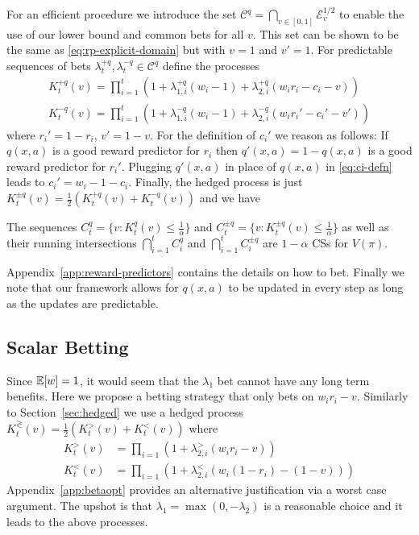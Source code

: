 For an efficient procedure we introduce the set 
$\mathcal{C}^q=\bigcap_{v \in [0,1]}\mathcal{E}_v^{1/2}$
to enable the use of our lower bound and common bets for all $v$.
This set can be shown to be the same as \eqref{eq:rp-explicit-domain}
but with $v=1$ and $v'=1$. For predictable sequences of 
bets $\lambda_{t}^{+q},\lambda_{t}^{-q}\in \mathcal{C}^q$ 
define the processes
\begin{align*}
K_t^{+q}(v) = \prod_{i=1}^{t}\left(1+\lambda_{1,i}^{+q} (w_i-1)+\lambda_{2,i}^{+q}(w_i r_i-c_i-v)\right)    \\
K_t^{-q}(v) = \prod_{i=1}^{t}\left(1+\lambda_{1,i}^{-q} (w_i-1)+\lambda_{2,i}^{-q} (w_i r_i'-c_i'-v')\right)    
\end{align*}
where $r_i'=1-r_i$, $v'=1-v$. For the definition of
$c_i'$ we reason as follows: If $q(x,a)$ is a good reward predictor
for $r_i$ then $q'(x,a)=1-q(x,a)$ is a good reward predictor for $r_i'$. 
Plugging $q'(x,a)$ in place of $q(x,a)$ in \eqref{eq:ci-defn} leads 
to $c_i' = w_i - 1 - c_i$. Finally, the hedged process is just
$
K_t^{\pm q}(v)=\frac{1}{2} (K_t^{+q}(v)+K_t^{-q}(v))
$
and we have
\begin{theorem}
The sequences $C_t^{q} = \{v:K_t^{q}(v)\leq \frac{1}{\alpha}\}$ and 
$C_t^{\pm q} = \{v:K_t^{\pm q}(v)\leq \frac{1}{\alpha}\}$ as well as
their running intersections $\bigcap_{i=1}^t C_i^{q}$ and
$\bigcap_{i=1}^t C_i^{\pm q}$ are $1-\alpha$ CSs for $V(\pi)$.
\end{theorem}
Appendix~\ref{app:reward-predictors} contains the details on how to bet.
Finally we note that our framework allows for $q(x,a)$ to be updated in every step as long as the updates are predictable. 

\subsection{Scalar Betting}
\label{sec:scalar}
Since $\mathbb{E}[w]=1$, it would seem that the $\lambda_1$ bet cannot have any long
term benefits. Here we propose a betting strategy that only
bets on $w_i r_i -v$.  Similarly to Section~\ref{sec:hedged} we use a hedged
process $K_t^{\gtrless}(v)=\frac{1}{2}\left(K_t^{>}(v)+K_t^{<}(v)\right)$ where
\begin{align*}
K_t^{>}(v)&=\prod_{i=1} \left(1+\lambda_{2,i}^{>} (w_i r_i -v)\right)\\
K_t^{<}(v)&=\prod_{i=1} \left(1+\lambda_{2,i}^{<} \left(w_i (1-r_i) -(1-v)\right)\right)
\end{align*}
Appendix~\ref{app:betaopt} provides an alternative justification via a worst
case argument.  The upshot is that $\lambda_1=\max(0,-\lambda_2)$ is a
reasonable choice and it leads to the above processes.

